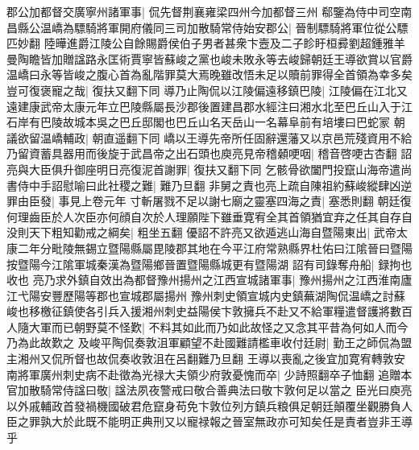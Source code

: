 郡公加都督交廣寧州諸軍事|{
	侃先督荆襄雍梁四州今加都督三州}
郗鑒為侍中司空南昌縣公温嶠為驃騎將軍開府儀同三司加散騎常侍始安郡公|{
	晉制驃騎將軍位從公驃匹妙翻}
陸曄進爵江陵公自餘賜爵侯伯子男者甚衆卞壼及二子眕盱桓彛劉超鍾雅羊曼陶瞻皆加贈諡路永匡術賈寧皆蘇峻之黨也峻未敗永等去峻歸朝廷王導欲賞以官爵温嶠曰永等皆峻之腹心首為亂階罪莫大焉晚雖改悟未足以贖前罪得全首領為幸多矣豈可復褒寵之哉|{
	復扶又翻下同}
導乃止陶侃以江陵偏遠移鎮巴陵|{
	江陵偏在江北又遠建康武帝太康元年立巴陵縣屬長沙郡後置建昌郡水經注曰湘水北至巴丘山入于江石岸有巴陵故城本吳之巴丘邸閣也巴丘山名天岳山一名幕阜前有培塿曰巴蛇冡}
朝議欲留温嶠輔政|{
	朝直遥翻下同}
嶠以王導先帝所任固辭還藩又以京邑荒殘資用不給乃留資蓄具器用而後旋于武昌帝之出石頭也庾亮見帝稽顙哽咽|{
	稽音啓哽古杏翻}
詔亮與大臣俱升御座明日亮復泥首謝罪|{
	復扶又翻下同}
乞骸骨欲闔門投竄山海帝遣尚書侍中手詔慰喻曰此社稷之難|{
	難乃旦翻}
非舅之責也亮上疏自陳祖約蘇峻縱肆凶逆罪由臣發|{
	事見上卷元年}
寸斬屠戮不足以謝七廟之靈塞四海之責|{
	塞悉則翻}
朝廷復何理齒臣於人次臣亦何顔自次於人理願陛下雖垂寛宥全其首領猶宜弃之任其自存自没則天下粗知勸戒之綱矣|{
	粗坐五翻}
優詔不許亮又欲遁逃山海自暨陽東出|{
	武帝太康二年分毗陵無錫立暨陽縣屬毘陵郡其地在今平江府常熟縣界杜佑曰江隂晉曰暨陽按暨陽今江隂軍城秦漢為暨陽鄉晉置暨陽縣城更有暨陽湖}
詔有司錄奪舟船|{
	録拘也收也}
亮乃求外鎮自效出為都督豫州揚州之江西宣城諸軍事|{
	豫州揚州之江西淮南廬江弋陽安豐歷陽等郡也宣城郡屬揚州}
豫州刺史領宣城内史鎮蕪湖陶侃温嶠之討蘇峻也移檄征鎮使各引兵入援湘州刺史益陽侯卞敦擁兵不赴又不給軍糧遣督護將數百人隨大軍而已朝野莫不怪歎|{
	不料其如此而乃如此故怪之又念其平昔為何如人而今乃為此故歎之}
及峻平陶侃奏敦沮軍顧望不赴國難請檻車收付廷尉|{
	勤王之師侃為盟主湘州又侃所督也故侃奏收敦沮在呂翻難乃旦翻}
王導以喪亂之後宜加寛宥轉敦安南將軍廣州刺史病不赴徵為光禄大夫領少府敦憂愧而卒|{
	少詩照翻卒子恤翻}
追贈本官加散騎常侍諡曰敬|{
	諡法夙夜警戒曰敬合善典法曰敬卞敦何足以當之}
臣光曰庾亮以外戚輔政首發禍機國破君危竄身苟免卞敦位列方鎮兵粮俱足朝廷顛覆坐觀勝負人臣之罪孰大於此既不能明正典刑又以寵禄報之晉室無政亦可知矣任是責者豈非王導乎

